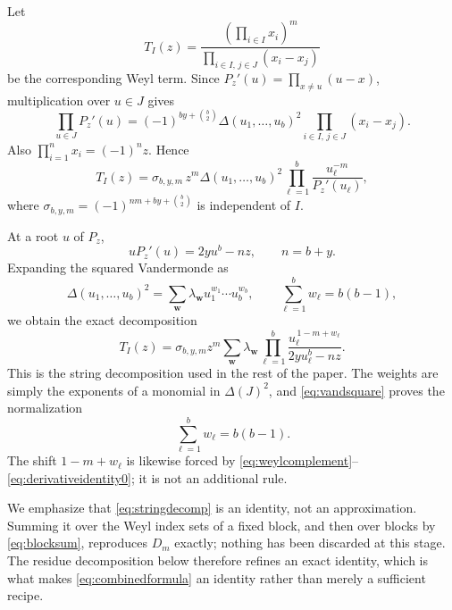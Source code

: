 \documentclass[11pt]{amsart}
\theoremstyle{remark}
\begin{document}
Let
\[
    T_I(z)=
    \frac{\left(\prod_{i\in I}x_i\right)^m}
    {\displaystyle\prod_{i\in I,\,j\in J}(x_i-x_j)}
\]
be the corresponding Weyl term.  Since $P_z'(u)=\prod_{x\neq u}(u-x)$, multiplication over $u\in J$ gives
\begin{equation}\label{eq:crossderivative}
 \prod_{u\in J}P_z'(u)
 =(-1)^{by+\binom b2}
   \Delta(u_1,\ldots,u_b)^2
   \prod_{i\in I,\,j\in J}(x_i-x_j).
\end{equation}
Also $\prod_{i=1}^{n}x_i=(-1)^nz$.  Hence
\begin{equation}\label{eq:weylcomplement}
 T_I(z)
 =\sigma_{b,y,m}\,z^m
  \Delta(u_1,\ldots,u_b)^2
  \prod_{\ell=1}^{b}\frac{u_\ell^{-m}}{P_z'(u_\ell)},
\end{equation}
where $\sigma_{b,y,m}=(-1)^{nm+by+\binom b2}$ is independent of $I$.

At a root $u$ of $P_z$,
\begin{equation}\label{eq:derivativeidentity0}
    uP_z'(u)=2yu^b-nz,
    \qquad n=b+y.
\end{equation}
Expanding the squared Vandermonde as
\begin{equation}\label{eq:vandsquare}
    \Delta(u_1,\ldots,u_b)^2
    =\sum_{\mathbf w}\lambda_{\mathbf w}
       u_1^{w_1}\cdots u_b^{w_b},
    \qquad
    \sum_{\ell=1}^{b}w_\ell=b(b-1),
\end{equation}
we obtain the exact decomposition
\begin{equation}\label{eq:stringdecomp}
 T_I(z)=\sigma_{b,y,m}z^m
 \sum_{\mathbf w}\lambda_{\mathbf w}
 \prod_{\ell=1}^{b}
 \frac{u_\ell^{\,1-m+w_\ell}}
      {2yu_\ell^b-nz}.
\end{equation}
This is the string decomposition used in the rest of the paper.  The weights are simply the exponents of a monomial in $\Delta(J)^2$, and \eqref{eq:vandsquare} proves the normalization
\begin{equation}\label{eq:weightsum}
    \sum_{\ell=1}^{b}w_\ell=b(b-1).
\end{equation}
The shift $1-m+w_\ell$ is likewise forced by \eqref{eq:weylcomplement}--\eqref{eq:derivativeidentity0}; it is not an additional rule.

We emphasize that \eqref{eq:stringdecomp} is an identity, not an approximation.  Summing it over the Weyl index sets of a fixed block, and then over blocks by \eqref{eq:blocksum}, reproduces $D_m$ exactly; nothing has been discarded at this stage.  The residue decomposition below therefore refines an exact identity, which is what makes \eqref{eq:combinedformula} an identity rather than merely a sufficient recipe.
\end{document}
